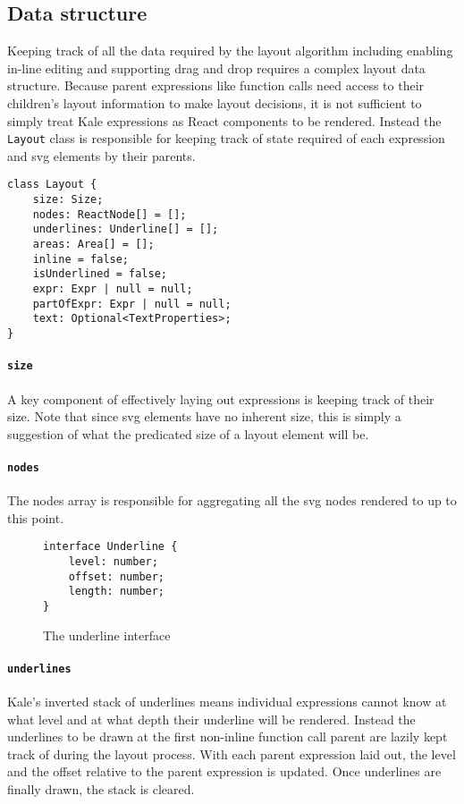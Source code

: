 \subsection{Data structure}

Keeping track of all the data required by the layout algorithm
including enabling in-line editing and supporting drag and drop requires a
complex layout data structure.
Because parent expressions like function calls need access to their children's
layout information to make layout decisions, it is not sufficient to simply
treat Kale expressions as React components to be rendered. Instead the
\texttt{Layout} class is responsible for keeping track of state required
of each expression and \ac{svg} elements by their parents.

\begin{Verbatim}[samepage, frame=lines]
class Layout {
    size: Size;
    nodes: ReactNode[] = [];
    underlines: Underline[] = [];
    areas: Area[] = [];
    inline = false;
    isUnderlined = false;
    expr: Expr | null = null;
    partOfExpr: Expr | null = null;
    text: Optional<TextProperties>;
}
\end{Verbatim}

\newcommand{\field}[1]{
	\paragraph{\texttt{#1}}
	\label{layout:#1}
}
\field{size} A key component of effectively laying out expressions is
keeping track of their size. Note that since \ac{svg} elements have no
inherent size, this is simply a suggestion of what the predicated size
of a layout element will be.

\field{nodes} The nodes array is responsible for aggregating all the
\ac{svg} nodes rendered to up to this point.

\setlength{\columnsep}{5ex}
\begin{wrapfigure}[7]{R}{30ex}
\vspace*{-\baselineskip}
\begin{Verbatim}[samepage]
interface Underline {
    level: number;
    offset: number;
    length: number;
}
\end{Verbatim}
\caption{The underline interface}
\end{wrapfigure}
\field{underlines} Kale's inverted stack of underlines means individual
expressions cannot know at what level and at what depth their underline will
be rendered. Instead the underlines to be drawn at the first non-inline
function call parent are lazily kept track of during the layout process. With
each parent expression laid
out, the level and the offset relative to the parent expression is updated.
Once underlines are finally drawn, the stack is cleared.

